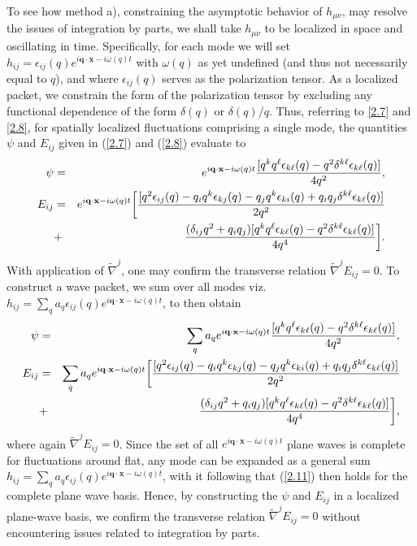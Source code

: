 To see how method a), constraining the asymptotic behavior of $h_{\mu\nu}$, may resolve the issues of integration by parts, we shall take $h_{\mu\nu}$  to be localized in space and oscillating in time. Specifically, for each mode we will set $h_{ij}=\epsilon_{ij}(q)e^{i\mathbf{q}\cdot\mathbf{x}-i\omega(q) t}$ with $\omega(q)$ as yet undefined (and thus not necessarily equal to $q$), and where $\epsilon_{ij}(q)$ serves as the polarization tensor. As a localized packet, we constrain the form of the polarization tensor by excluding any functional dependence of the form $\delta(q)$ or $\delta(q)/q$. Thus, referring to \eqref{2.7} and \eqref{2.8}, for spatially localized fluctuations comprising a single mode, the quantities $\psi$ and $E_{ij}$ given in (\ref{2.7}) and (\ref{2.8}) evaluate to
%
\begin{eqnarray}
\psi&=&e^{i\mathbf{q}\cdot\mathbf{x}-i\omega(q) t}\frac{[q^kq^{\ell}\epsilon_{k\ell}(q)-q^2\delta^{k\ell}\epsilon_{k\ell}(q)]}{4q^2},
\nonumber\\
E_{ij}&=&e^{i\mathbf{q}\cdot\mathbf{x}-i\omega(q) t}\bigg{[}\frac{[q^2\epsilon_{ij}(q)-q_iq^k\epsilon_{kj}(q)-q_jq^k\epsilon_{ki}(q)+q_iq_j\delta^{k\ell}\epsilon_{k\ell}(q)]}{2q^2}
\nonumber\\
&+&\frac{(\delta_{ij}q^2+q_iq_j)[q^kq^{\ell}\epsilon_{k\ell}(q)-q^2\delta^{k\ell}\epsilon_{k\ell}(q)]}{4q^4}\bigg{]}.
\label{2.10}
\end{eqnarray}
%
With application of $\tilde\nabla^j$, one may confirm the transverse relation $\tilde{\nabla}^jE_{ij}=0$. To construct a wave packet, we sum over all modes viz. $h_{ij}=\sum_qa_q\epsilon_{ij}(q)e^{i\mathbf{q}\cdot\mathbf{x}-i\omega(q) t}$, to then obtain
%
\begin{eqnarray}
\psi&=&\sum_qa_qe^{i\mathbf{q}\cdot\mathbf{x}-i\omega(q) t}\frac{[q^kq^{\ell}\epsilon_{k\ell}(q)-q^2\delta^{k\ell}\epsilon_{k\ell}(q)]}{4q^2},
\nonumber\\
E_{ij}&=&\sum_qa_qe^{i\mathbf{q}\cdot\mathbf{x}-i\omega(q) t}\bigg{[}\frac{[q^2\epsilon_{ij}(q)-q_iq^k\epsilon_{kj}(q)-q_jq^k\epsilon_{ki}(q)+q_iq_j\delta^{k\ell}\epsilon_{k\ell}(q)]}{2q^2}
\nonumber\\
&+&\frac{(\delta_{ij}q^2+q_iq_j)[q^kq^{\ell}\epsilon_{k\ell}(q)-q^2\delta^{k\ell}\epsilon_{k\ell}(q)]}{4q^4}\bigg{]},
\label{2.11}
\end{eqnarray}
%
where again $\tilde{\nabla}^jE_{ij}=0$. Since the set of all $e^{i\mathbf{q}\cdot\mathbf{x}-i\omega (q)t}$ plane waves is complete for fluctuations around flat, any mode can be expanded as a general sum $h_{ij}=\sum_qa_q\epsilon_{ij}(q)e^{i\mathbf{q}\cdot\mathbf{x}-i\omega(q) t}$, with it following that (\ref{2.11}) then holds for the complete plane wave basis. Hence, by constructing the $\psi$ and $E_{ij}$ in a localized plane-wave basis, we confirm the transverse relation $\tilde\nabla^j E_{ij} = 0$ without encountering issues related to integration by parts.

